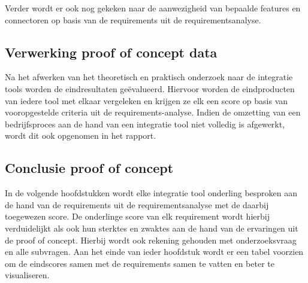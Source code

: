 Verder wordt er ook nog gekeken naar de aanwezigheid van bepaalde features en connectoren op basis van de requirements uit de requirementsanalyse.

\subsection{Verwerking proof of concept data}
\label{sec:Verwerking proof of concept dataBP}

Na het afwerken van het theoretisch en praktisch onderzoek naar de integratie tools worden de eindresultaten geëvalueerd. Hiervoor worden de eindproducten van iedere tool met elkaar vergeleken en krijgen ze elk een score op basis van vooropgestelde criteria uit de requirements-analyse. Indien de omzetting van een bedrijfsproces aan de hand van een integratie tool niet volledig is afgewerkt, wordt dit ook opgenomen in het rapport.

\subsection{Conclusie proof of concept}
\label{sec:Conclusie proof of conceptBP}

In de volgende hoofdstukken wordt elke integratie tool onderling besproken aan de hand van de requirements uit de requirementsanalyse met de daarbij toegewezen score. De onderlinge score van elk requirement wordt hierbij verduidelijkt als ook hun sterktes en zwaktes aan de hand van de ervaringen uit de proof of concept. Hierbij wordt ook rekening gehouden met onderzoeksvraag en alle subvragen. Aan het einde van ieder hoofdstuk wordt er een tabel voorzien om de eindscores samen met de requirements samen te vatten en beter te visualiseren.

